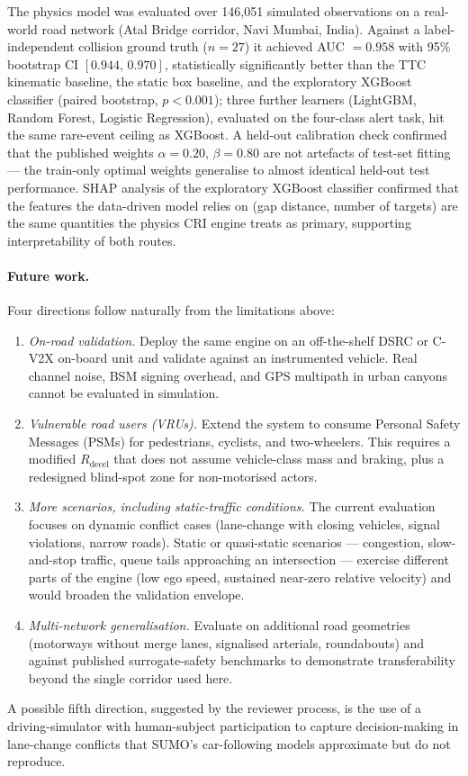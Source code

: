 \documentclass[sn-mathphys-num,Numbered,iicol]{sn-jnl}
\begin{document}
The physics model was evaluated over 146{,}051 simulated observations on a real-world road network (Atal Bridge corridor, Navi Mumbai, India). Against a label-independent collision ground truth ($n = 27$) it achieved AUC $= 0.958$ with 95\% bootstrap CI $[0.944,\,0.970]$, statistically significantly better than the TTC kinematic baseline, the static box baseline, and the exploratory XGBoost classifier (paired bootstrap, $p<0.001$); three further learners (LightGBM, Random Forest, Logistic Regression), evaluated on the four-class alert task, hit the same rare-event ceiling as XGBoost. A held-out calibration check confirmed that the published weights $\alpha = 0.20$, $\beta = 0.80$ are not artefacts of test-set fitting --- the train-only optimal weights generalise to almost identical held-out test performance. SHAP analysis of the exploratory XGBoost classifier confirmed that the features the data-driven model relies on (gap distance, number of targets) are the same quantities the physics CRI engine treats as primary, supporting interpretability of both routes.

\paragraph{Future work.}
Four directions follow naturally from the limitations above:
\begin{enumerate}
\item \emph{On-road validation.} Deploy the same engine on an off-the-shelf DSRC or C-V2X on-board unit and validate against an instrumented vehicle. Real channel noise, BSM signing overhead, and GPS multipath in urban canyons cannot be evaluated in simulation.
\item \emph{Vulnerable road users (VRUs).} Extend the system to consume Personal Safety Messages (PSMs) for pedestrians, cyclists, and two-wheelers. This requires a modified $R_{\mathrm{decel}}$ that does not assume vehicle-class mass and braking, plus a redesigned blind-spot zone for non-motorised actors.
\item \emph{More scenarios, including static-traffic conditions.} The current evaluation focuses on dynamic conflict cases (lane-change with closing vehicles, signal violations, narrow roads). Static or quasi-static scenarios --- congestion, slow-and-stop traffic, queue tails approaching an intersection --- exercise different parts of the engine (low ego speed, sustained near-zero relative velocity) and would broaden the validation envelope.
\item \emph{Multi-network generalisation.} Evaluate on additional road geometries (motorways without merge lanes, signalised arterials, roundabouts) and against published surrogate-safety benchmarks to demonstrate transferability beyond the single corridor used here.
\end{enumerate}
A possible fifth direction, suggested by the reviewer process, is the use of a driving-simulator with human-subject participation to capture decision-making in lane-change conflicts that SUMO's car-following models approximate but do not reproduce.
\end{document}
